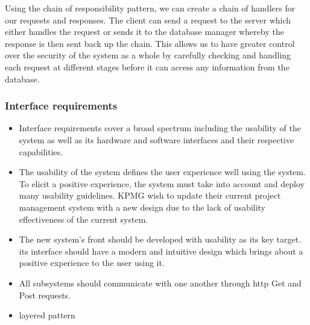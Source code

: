 \documentclass[a4paper,12pt]{article}
\begin{document}
    Using the chain of responsibility pattern, we can create a chain of handlers for our requests and responses. The client can send a request to the server which either handles the request or sends it to the database manager whereby the response is then sent back up the chain. This allows us to have greater control over the security of the system as a whole by carefully checking and handling each request at different stages before it can access any information from the database.
    
\subsubsection{Interface requirements}
    \begin{itemize}
        \item Interface requirements cover a broad spectrum including the usability of the system as well as its hardware and software interfaces and their respective capabilities. 
        
        \item The usability of the system defines the user experience well using the system. To elicit a positive experience, the system must take into account and deploy many usability guidelines. KPMG wish to update their current project management system with a new design due to the lack of usability effectiveness of the current system. 
        
    \end{itemize}
    
    \begin{itemize}
        \item The new system's front should be developed with usability as its key target. its interface should have a modern and intuitive design which brings about a positive experience to the user using it.
        
        \item All subsystems should communicate with one another through http Get and Post requests.
    \end{itemize}
    
    \begin{itemize}
    \item layered pattern
    \end{itemize}
	
\end{document}
